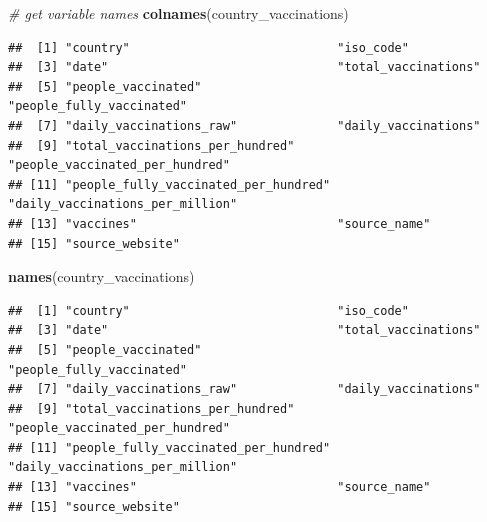 \documentclass[
]{book}
\newenvironment{Shaded}{\begin{snugshade}}{\end{snugshade}}
\newcommand{\CommentTok}[1]{\textcolor[rgb]{0.56,0.35,0.01}{\textit{#1}}}
\newcommand{\KeywordTok}[1]{\textcolor[rgb]{0.13,0.29,0.53}{\textbf{#1}}}
\newcommand{\NormalTok}[1]{#1}
\newcommand{\OperatorTok}[1]{\textcolor[rgb]{0.81,0.36,0.00}{\textbf{#1}}}
\begin{document}
\begin{Shaded}
\begin{Highlighting}[]
\CommentTok{# get variable names}
\KeywordTok{colnames}\NormalTok{(country_vaccinations)}
\end{Highlighting}
\end{Shaded}

\begin{verbatim}
##  [1] "country"                             "iso_code"                           
##  [3] "date"                                "total_vaccinations"                 
##  [5] "people_vaccinated"                   "people_fully_vaccinated"            
##  [7] "daily_vaccinations_raw"              "daily_vaccinations"                 
##  [9] "total_vaccinations_per_hundred"      "people_vaccinated_per_hundred"      
## [11] "people_fully_vaccinated_per_hundred" "daily_vaccinations_per_million"     
## [13] "vaccines"                            "source_name"                        
## [15] "source_website"
\end{verbatim}

\begin{Shaded}
\begin{Highlighting}[]
\KeywordTok{names}\NormalTok{(country_vaccinations)}
\end{Highlighting}
\end{Shaded}

\begin{verbatim}
##  [1] "country"                             "iso_code"                           
##  [3] "date"                                "total_vaccinations"                 
##  [5] "people_vaccinated"                   "people_fully_vaccinated"            
##  [7] "daily_vaccinations_raw"              "daily_vaccinations"                 
##  [9] "total_vaccinations_per_hundred"      "people_vaccinated_per_hundred"      
## [11] "people_fully_vaccinated_per_hundred" "daily_vaccinations_per_million"     
## [13] "vaccines"                            "source_name"                        
## [15] "source_website"
\end{verbatim}

\begin{Shaded}
\end{Shaded}
\end{document}
